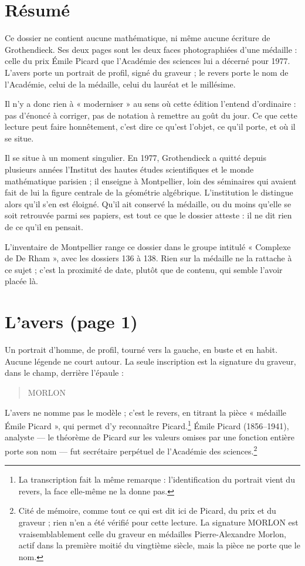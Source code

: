 \documentclass[11pt,a4paper]{article}
\begin{document}
\section*{Résumé}

\begin{resume}
Ce dossier ne contient aucune mathématique, ni même aucune écriture de
Grothendieck. Ses deux pages sont les deux faces photographiées d'une médaille :
celle du prix Émile Picard que l'Académie des sciences lui a décerné pour 1977.
L'avers porte un portrait de profil, signé du graveur ; le revers porte le nom
de l'Académie, celui de la médaille, celui du lauréat et le millésime.

Il n'y a donc rien à « moderniser » au sens où cette édition l'entend
d'ordinaire : pas d'énoncé à corriger, pas de notation à remettre au goût du
jour. Ce que cette lecture peut faire honnêtement, c'est dire ce qu'est
l'objet, ce qu'il porte, et où il se situe.

Il se situe à un moment singulier. En 1977, Grothendieck a quitté depuis
plusieurs années l'Institut des hautes études scientifiques et le monde
mathématique parisien ; il enseigne à Montpellier, loin des séminaires qui
avaient fait de lui la figure centrale de la géométrie algébrique. L'institution
le distingue alors qu'il s'en est éloigné. Qu'il ait conservé la médaille,
ou du moins qu'elle se soit retrouvée parmi ses papiers, est tout ce que le
dossier atteste : il ne dit rien de ce qu'il en pensait.

L'inventaire de Montpellier range ce dossier dans le groupe intitulé
« Complexe de De Rham », avec les dossiers 136 à 138. Rien sur la médaille ne
la rattache à ce sujet ; c'est la proximité de date, plutôt que de contenu, qui
semble l'avoir placée là.

\end{resume}

\section*{L'avers (page 1)}

Un portrait d'homme, de profil, tourné vers la gauche, en buste et en habit.
Aucune légende ne court autour. La seule inscription est la signature du
graveur, dans le champ, derrière l'épaule :
\begin{quote}
MORLON
\end{quote}
L'avers ne nomme pas le modèle ; c'est le revers, en titrant la pièce
« médaille Émile Picard », qui permet d'y reconnaître Picard.\footnote{La
transcription fait la même remarque : l'identification du portrait vient du
revers, la face elle-même ne la donne pas.} Émile Picard (1856--1941),
analyste --- le théorème de Picard sur les valeurs omises par une fonction
entière porte son nom --- fut secrétaire perpétuel de l'Académie des
sciences.\footnote{Cité de mémoire, comme tout ce qui est dit ici de Picard,
du prix et du graveur ; rien n'en a été vérifié pour cette lecture. La
signature MORLON est vraisemblablement celle du graveur en médailles
Pierre-Alexandre Morlon, actif dans la première moitié du vingtième
siècle, mais la pièce ne porte que le nom.}
\end{document}
